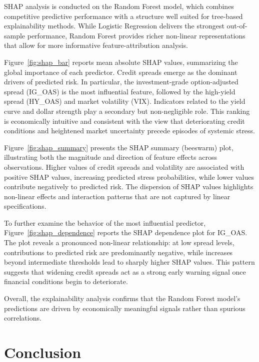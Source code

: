 \documentclass[11pt,a4paper]{article}
\begin{document}
SHAP analysis is conducted on the Random Forest model, which combines competitive predictive performance with a structure well suited for tree-based explainability methods. While Logistic Regression delivers the strongest out-of-sample performance, Random Forest provides richer non-linear representations that allow for more informative feature-attribution analysis.

Figure~\ref{fig:shap_bar} reports mean absolute SHAP values, summarizing the global importance of each predictor. Credit spreads emerge as the dominant drivers of predicted risk. In particular, the investment-grade option-adjusted spread (IG\_OAS) is the most influential feature, followed by the high-yield spread (HY\_OAS) and market volatility (VIX). Indicators related to the yield curve and dollar strength play a secondary but non-negligible role. This ranking is economically intuitive and consistent with the view that deteriorating credit conditions and heightened market uncertainty precede episodes of systemic stress.

Figure~\ref{fig:shap_summary} presents the SHAP summary (beeswarm) plot, illustrating both the magnitude and direction of feature effects across observations. Higher values of credit spreads and volatility are associated with positive SHAP values, increasing predicted stress probabilities, while lower values contribute negatively to predicted risk. The dispersion of SHAP values highlights non-linear effects and interaction patterns that are not captured by linear specifications.

To further examine the behavior of the most influential predictor, Figure~\ref{fig:shap_dependence} reports the SHAP dependence plot for IG\_OAS. The plot reveals a pronounced non-linear relationship: at low spread levels, contributions to predicted risk are predominantly negative, while increases beyond intermediate thresholds lead to sharply higher SHAP values. This pattern suggests that widening credit spreads act as a strong early warning signal once financial conditions begin to deteriorate.

Overall, the explainability analysis confirms that the Random Forest model’s predictions are driven by economically meaningful signals rather than spurious correlations.

\section{Conclusion}
\label{sec:conclusion}
\end{document}
